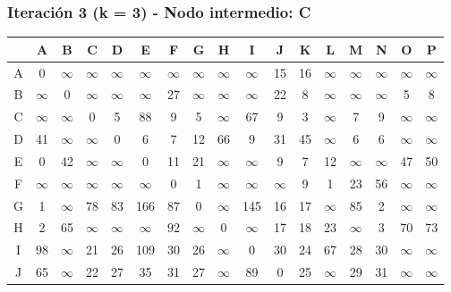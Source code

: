 \documentclass[12pt]{article}
\begin{document}
\subsubsection{Iteración 3 (k = 3) - Nodo intermedio: C}
\begin{table}[h!]
\centering
\begin{tabular}{|c|c|c|c|c|c|c|c|c|c|c|c|c|c|c|c|c|}
\hline
 & A & B & C & D & E & F & G & H & I & J & K & L & M & N & O & P \\\hline
A & 0 & $\infty$ & $\infty$ & $\infty$ & $\infty$ & $\infty$ & $\infty$ & $\infty$ & $\infty$ & 15 & 16 & $\infty$ & $\infty$ & $\infty$ & $\infty$ & $\infty$ \\\hline
B & $\infty$ & 0 & $\infty$ & $\infty$ & $\infty$ & 27 & $\infty$ & $\infty$ & $\infty$ & 22 & 8 & $\infty$ & $\infty$ & $\infty$ & 5 & 8 \\\hline
C & $\infty$ & $\infty$ & 0 & 5 & 88 & 9 & 5 & $\infty$ & 67 & 9 & 3 & $\infty$ & 7 & 9 & $\infty$ & $\infty$ \\\hline
D & 41 & $\infty$ & $\infty$ & 0 & 6 & 7 & 12 & 66 & 9 & 31 & 45 & $\infty$ & 6 & 6 & $\infty$ & $\infty$ \\\hline
E & 0 & 42 & $\infty$ & $\infty$ & 0 & 11 & 21 & $\infty$ & $\infty$ & 9 & 7 & 12 & $\infty$ & $\infty$ & 47 & 50 \\\hline
F & $\infty$ & $\infty$ & $\infty$ & $\infty$ & $\infty$ & 0 & 1 & $\infty$ & $\infty$ & $\infty$ & 9 & 1 & 23 & 56 & $\infty$ & $\infty$ \\\hline
G & 1 & $\infty$ & 78 & \cellcolor{lightgreen} 83 & \cellcolor{lightgreen} 166 & \cellcolor{lightgreen} 87 & 0 & $\infty$ & \cellcolor{lightgreen} 145 & 16 & 17 & $\infty$ & \cellcolor{lightgreen} 85 & 2 & $\infty$ & $\infty$ \\\hline
H & 2 & 65 & $\infty$ & $\infty$ & $\infty$ & 92 & $\infty$ & 0 & $\infty$ & 17 & 18 & 23 & $\infty$ & 3 & 70 & 73 \\\hline
I & 98 & $\infty$ & 21 & \cellcolor{lightgreen} 26 & \cellcolor{lightgreen} 109 & \cellcolor{lightgreen} 30 & \cellcolor{lightgreen} 26 & $\infty$ & 0 & \cellcolor{lightgreen} 30 & \cellcolor{lightgreen} 24 & 67 & \cellcolor{lightgreen} 28 & \cellcolor{lightgreen} 30 & $\infty$ & $\infty$ \\\hline
J & 65 & $\infty$ & 22 & 27 & 35 & \cellcolor{lightgreen} 31 & \cellcolor{lightgreen} 27 & $\infty$ & \cellcolor{lightgreen} 89 & 0 & \cellcolor{lightgreen} 25 & $\infty$ & \cellcolor{lightgreen} 29 & \cellcolor{lightgreen} 31 & $\infty$ & $\infty$ \\\hline

\end{tabular}
\end{table}
\end{document}
